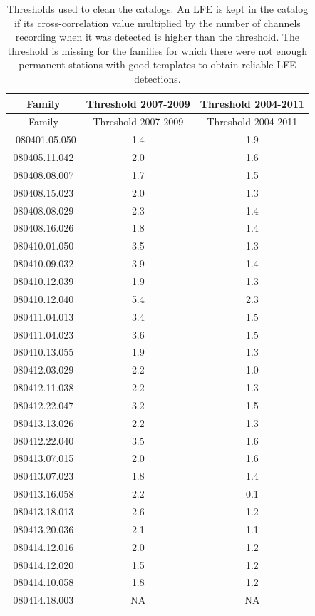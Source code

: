 \documentclass[draft]{agujournal2019}
\begin{document}
\begin{center}
\begin{longtable}{c c c}
\caption{Thresholds used to clean the catalogs. An LFE is kept in the catalog if its cross-correlation value multiplied by the number of channels recording when it was detected is higher than the threshold. The threshold is missing for the families for which there were not enough permanent stations with good templates to obtain reliable LFE detections.} \\
\hline
Family & Threshold 2007-2009 & Threshold 2004-2011 \\
\hline
\endfirsthead
\hline
Family & Threshold 2007-2009 & Threshold 2004-2011 \\
\hline
\endhead
\endfoot
\hline
\endlastfoot\
080401.05.050 & 1.4 & 1.9 \\
080405.11.042 & 2.0 & 1.6 \\
080408.08.007 & 1.7 & 1.5 \\
080408.15.023 & 2.0 & 1.3 \\
080408.08.029 & 2.3 & 1.4 \\
080408.16.026 & 1.8 & 1.4 \\
080410.01.050 & 3.5 & 1.3 \\
080410.09.032 & 3.9 & 1.4 \\
080410.12.039 & 1.9 & 1.3 \\
080410.12.040 & 5.4 & 2.3 \\
080411.04.013 & 3.4 & 1.5 \\
080411.04.023 & 3.6 & 1.5 \\
080410.13.055 & 1.9 & 1.3 \\
080412.03.029 & 2.2 & 1.0 \\
080412.11.038 & 2.2 & 1.3 \\
080412.22.047 & 3.2 & 1.5 \\
080413.13.026 & 2.2 & 1.3 \\
080412.22.040 & 3.5 & 1.6 \\
080413.07.015 & 2.0 & 1.6 \\
080413.07.023 & 1.8 & 1.4 \\
080413.16.058 & 2.2 & 0.1 \\
080413.18.013 & 2.6 & 1.2 \\
080413.20.036 & 2.1 & 1.1 \\
080414.12.016 & 2.0 & 1.2 \\
080414.12.020 & 1.5 & 1.2 \\
080414.10.058 & 1.8 & 1.2 \\
080414.18.003 & NA & NA \\

\end{longtable}
\end{center}
\end{document}
